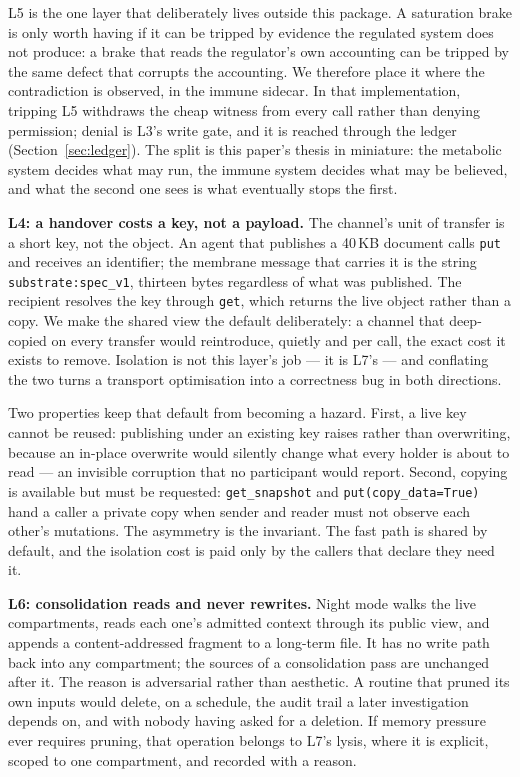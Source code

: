 \documentclass[conference]{IEEEtran}
\begin{document}
L5 is the one layer that deliberately lives outside this package. A saturation
brake is only worth having if it can be tripped by evidence the regulated system
does not produce: a brake that reads the regulator's own accounting can be
tripped by the same defect that corrupts the accounting. We therefore place it
where the contradiction is observed, in the immune sidecar. In that
implementation, tripping L5 withdraws the cheap witness from every call rather
than denying permission; denial is L3's write gate, and it is reached through
the ledger (Section~\ref{sec:ledger}). The split is this paper's thesis in
miniature: the metabolic system decides what may run, the immune system decides
what may be believed, and what the second one sees is what eventually stops the
first.

\textbf{L4: a handover costs a key, not a payload.}
The channel's unit of transfer is a short key, not the object. An agent that
publishes a 40\,KB document calls \texttt{put} and receives an identifier; the
membrane message that carries it is the string \texttt{substrate:spec\_v1},
thirteen bytes regardless of what was published. The recipient resolves the key
through \texttt{get}, which returns the live object rather than a copy. We make
the shared view the default deliberately: a channel that deep-copied on every
transfer would reintroduce, quietly and per call, the exact cost it exists to
remove. Isolation is not this layer's job --- it is L7's --- and conflating the
two turns a transport optimisation into a correctness bug in both directions.

Two properties keep that default from becoming a hazard. First, a live key cannot
be reused: publishing under an existing key raises rather than overwriting,
because an in-place overwrite would silently change what every holder is about to
read --- an invisible corruption that no participant would report. Second,
copying is available but must be requested: \texttt{get\_snapshot} and
\texttt{put(copy\_data=True)} hand a caller a private copy when sender and reader
must not observe each other's mutations. The asymmetry is the invariant. The fast
path is shared by default, and the isolation cost is paid only by the callers
that declare they need it.

\textbf{L6: consolidation reads and never rewrites.}
Night mode walks the live compartments, reads each one's admitted context through
its public view, and appends a content-addressed fragment to a long-term file. It
has no write path back into any compartment; the sources of a consolidation pass
are unchanged after it. The reason is adversarial rather than aesthetic. A
routine that pruned its own inputs would delete, on a schedule, the audit trail a
later investigation depends on, and with nobody having asked for a deletion. If
memory pressure ever requires pruning, that operation belongs to L7's lysis, where
it is explicit, scoped to one compartment, and recorded with a reason.
\end{document}
